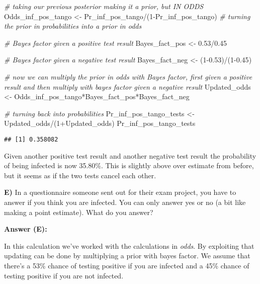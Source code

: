 \documentclass[
]{article}
\newenvironment{Shaded}{\begin{snugshade}}{\end{snugshade}}
\newcommand{\CommentTok}[1]{\textcolor[rgb]{0.56,0.35,0.01}{\textit{#1}}}
\newcommand{\DecValTok}[1]{\textcolor[rgb]{0.00,0.00,0.81}{#1}}
\newcommand{\FloatTok}[1]{\textcolor[rgb]{0.00,0.00,0.81}{#1}}
\newcommand{\NormalTok}[1]{#1}
\newcommand{\OtherTok}[1]{\textcolor[rgb]{0.56,0.35,0.01}{#1}}
\newcommand{\SpecialCharTok}[1]{\textcolor[rgb]{0.00,0.00,0.00}{#1}}
\begin{document}
\begin{Shaded}
\begin{Highlighting}[]
\CommentTok{\# taking our previous posterior making it a prior, but IN ODDS}
\NormalTok{Odds\_inf\_pos\_tango }\OtherTok{\textless{}{-}}\NormalTok{ Pr\_inf\_pos\_tango}\SpecialCharTok{/}\NormalTok{(}\DecValTok{1}\SpecialCharTok{{-}}\NormalTok{Pr\_inf\_pos\_tango) }\CommentTok{\# turning the prior in probabilities into a prior in odds}

\CommentTok{\# Bayes factor given a positive test result}
\NormalTok{Bayes\_fact\_pos }\OtherTok{\textless{}{-}} \FloatTok{0.53}\SpecialCharTok{/}\FloatTok{0.45}

\CommentTok{\# Bayes factor given a negative test result}
\NormalTok{Bayes\_fact\_neg }\OtherTok{\textless{}{-}}\NormalTok{ (}\DecValTok{1}\FloatTok{{-}0.53}\NormalTok{)}\SpecialCharTok{/}\NormalTok{(}\DecValTok{1}\FloatTok{{-}0.45}\NormalTok{)}

\CommentTok{\# now we can multiply the prior in odds with Bayes factor, first given a positive result and then multiply with bayes factor given a negative result}
\NormalTok{Updated\_odds }\OtherTok{\textless{}{-}}\NormalTok{ Odds\_inf\_pos\_tango}\SpecialCharTok{*}\NormalTok{Bayes\_fact\_pos}\SpecialCharTok{*}\NormalTok{Bayes\_fact\_neg }

\CommentTok{\# turning back into probabilities}
\NormalTok{Pr\_inf\_pos\_tango\_tests }\OtherTok{\textless{}{-}}\NormalTok{ Updated\_odds}\SpecialCharTok{/}\NormalTok{(}\DecValTok{1}\SpecialCharTok{+}\NormalTok{Updated\_odds)}
\NormalTok{Pr\_inf\_pos\_tango\_tests}
\end{Highlighting}
\end{Shaded}

\begin{verbatim}
## [1] 0.358082
\end{verbatim}

Given another positive test result and another negative test result the
probability of being infected is now 35.80\%. This is slightly above
over estimate from before, but it seems as if the two tests cancel each
other.

\textbf{E)} In a questionnaire someone sent out for their exam project,
you have to answer if you think you are infected. You can only answer
yes or no (a bit like making a point estimate). What do you answer?

\textbf{Answer (E):}

In this calculation we've worked with the calculations in \emph{odds}.
By exploiting that updating can be done by multiplying a prior with
bayes factor. We assume that there's a 53\% chance of testing positive
if you are infected and a 45\% chance of testing positive if you are not
infected.
\end{document}
